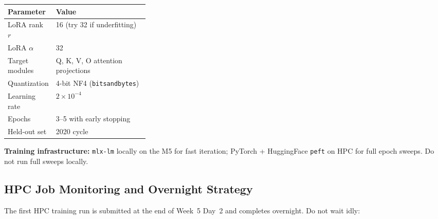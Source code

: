 \documentclass[11pt]{article}
\begin{document}
\begin{center}
\begin{tabularx}{\linewidth}{p{0.32\linewidth}X}
\toprule
\textbf{Parameter} & \textbf{Value} \\
\midrule
LoRA rank $r$ & 16 (try 32 if underfitting) \\
LoRA $\alpha$ & 32 \\
Target modules & Q, K, V, O attention projections \\
Quantization & 4-bit NF4 (\texttt{bitsandbytes}) \\
Learning rate & $2 \times 10^{-4}$ \\
Epochs & 3--5 with early stopping \\
Held-out set & 2020 cycle \\
\bottomrule
\end{tabularx}
\end{center}

\textbf{Training infrastructure:} \texttt{mlx-lm} locally on the M5 for fast iteration;
PyTorch + HuggingFace \texttt{peft} on HPC for full epoch sweeps. Do not run full sweeps
locally.

\subsection*{HPC Job Monitoring and Overnight Strategy}

The first HPC training run is submitted at the end of Week~5 Day~2 and completes
overnight. Do not wait idly:
\end{document}
